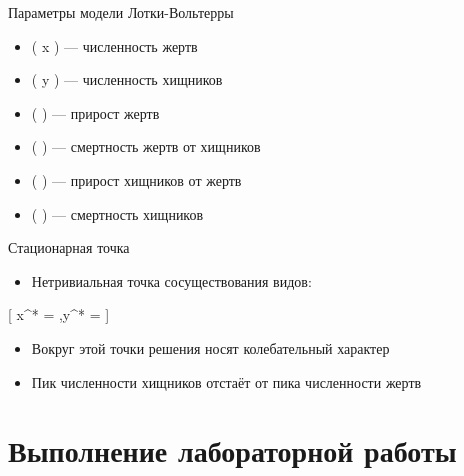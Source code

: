 \documentclass[
  ignorenonframetext,
  aspectratio=169,
  russian,
]{beamer}
\providecommand{\tightlist}{%
  \setlength{\itemsep}{0pt}\setlength{\parskip}{0pt}}\usepackage{longtable,booktabs,array}
\begin{document}
\begin{frame}{Параметры модели Лотки-Вольтерры}
\label{ux43fux430ux440ux430ux43cux435ux442ux440ux44b-ux43cux43eux434ux435ux43bux438-ux43bux43eux442ux43aux438-ux432ux43eux43bux44cux442ux435ux440ux440ux44b}
\begin{itemize}[<+->]
\tightlist
\item
  ( x ) --- численность жертв
\item
  ( y ) --- численность хищников
\item
  ( \alpha ) --- прирост жертв
\item
  ( \beta ) --- смертность жертв от хищников
\item
  ( \delta ) --- прирост хищников от жертв
\item
  ( \gamma ) --- смертность хищников
\end{itemize}
\end{frame}

\begin{frame}{Стационарная точка}
\label{ux441ux442ux430ux446ux438ux43eux43dux430ux440ux43dux430ux44f-ux442ux43eux447ux43aux430}
\begin{itemize}[<+->]
\tightlist
\item
  Нетривиальная точка сосуществования видов:
\end{itemize}

{[} x\^{}* = \frac{\gamma}{\delta},\quad y\^{}* = \frac{\alpha}{\beta}
{]}

\begin{itemize}[<+->]
\tightlist
\item
  Вокруг этой точки решения носят колебательный характер
\item
  Пик численности хищников отстаёт от пика численности жертв
\end{itemize}
\end{frame}

\section{Выполнение лабораторной
работы}\label{ux432ux44bux43fux43eux43bux43dux435ux43dux438ux435-ux43bux430ux431ux43eux440ux430ux442ux43eux440ux43dux43eux439-ux440ux430ux431ux43eux442ux44b}
\end{document}
